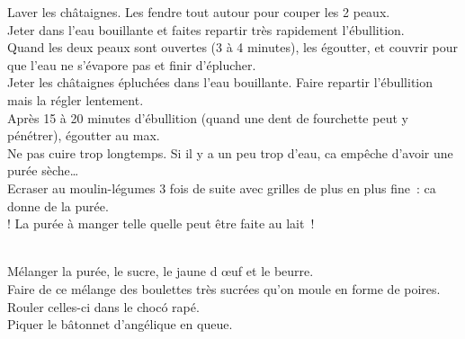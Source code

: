 \begin{minipage}[c]{\textwidth}
Laver les châtaignes. Les fendre tout autour pour couper les 2 peaux. \\
Jeter dans l’eau bouillante et faites repartir très rapidement l’ébullition. \\
Quand les deux peaux sont ouvertes (3 à 4 minutes), les égoutter, et couvrir pour que l’eau ne s’évapore pas et finir d’éplucher. \\
Jeter les châtaignes épluchées dans l’eau bouillante. Faire repartir l’ébullition mais la régler lentement. \\
Après 15 à 20 minutes d’ébullition (quand une dent de fourchette peut y pénétrer), égoutter au max. \\
Ne pas cuire trop longtemps. Si il y a un peu trop d’eau, ca empêche d’avoir une purée sèche…\\
Ecraser au moulin-légumes 3 fois de suite avec grilles de plus en plus fine : ca donne de la purée. \\
! La purée à manger telle quelle peut être faite au lait !\\
\\

\end{minipage}

\begin{minipage}[c]{\textwidth}
Mélanger la purée, le sucre, le jaune d œuf et le beurre. \\
Faire de ce mélange des boulettes très sucrées qu’on moule en forme de poires. \\
Rouler celles-ci dans le chocó rapé. \\
Piquer le bâtonnet d’angélique en queue.\\
\\

\end{minipage}

